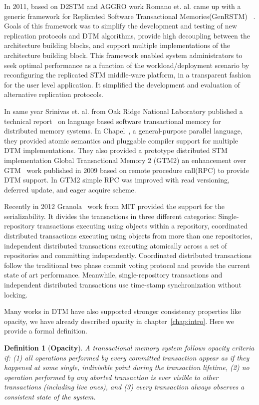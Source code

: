 \documentclass[12pt,english]{report}
\newtheorem{definition}{Definition}[section]
\begin{document}
In 2011, based on D2STM and AGGRO work Romano et. al. came up with a generic framework for Replicated Software Transactional Memories(GenRSTM) ~\cite{GenRSTM:6038614}. Goals of this framework was to simplify the development and testing of new replication protocols and DTM algorithms, provide high decoupling between the architecture building blocks, and support multiple implementations of the architecture building block. This framework enabled system administrators to seek optimal performance as a function of the workload/deployment scenario by reconfiguring the replicated STM middle-ware platform, in a transparent fashion for the
user level application. It simplified the development and evaluation of alternative replication protocols.

In same year Srinivas et. al. from Oak Ridge National Laboratory published a technical report~\cite{sridharan2011scalable} on language based software transactional memory for distributed memory systems. In Chapel~\cite{chapel:Language}, a general-purpose parallel language, they provided atomic semantics and pluggable compiler support for multiple DTM implementations. They also provided a prototype distributed STM implementation Global Transactional Memory 2 (GTM2) an enhancement over GTM~\cite{sridharan2009scalable} work published in 2009 based on remote procedure call(RPC) to provide DTM  support. In GTM2 simple RPC was improved with read versioning, deferred update, and eager acquire scheme.

Recently in 2012 Granola~\cite{cowling2012granola} work from MIT provided the support for the serializability. It divides the transactions in three different categories: Single-repository transactions executing using objects within a repository, coordinated distributed transactions executing using objects from more than one repositories, independent distributed transactions executing atomically across a set of repositories and committing independently. Coordinated distributed transactions follow the traditional two phase commit voting protocol and provide the current state of art performance. Meanwhile, single-repository transactions and independent distributed transactions use time-stamp synchronization without locking.

Many works in DTM have also supported stronger consistency properties like opacity, we have already described opacity in chapter~\ref{chap:intro}. Here we provide a formal definition.
\begin{definition}[\textbf{Opacity}]
A transactional memory system follows opacity criteria if: (1) all operations performed by every committed transaction appear as if they happened at some single, indivisible point during the transaction lifetime, (2) no operation performed by any aborted transaction is ever visible to other transactions (including live ones), and (3) every transaction always observes a consistent state of the system.~\cite{Guerraoui:2008:CTM:1345206.1345233}
\end{definition}
\end{document}
